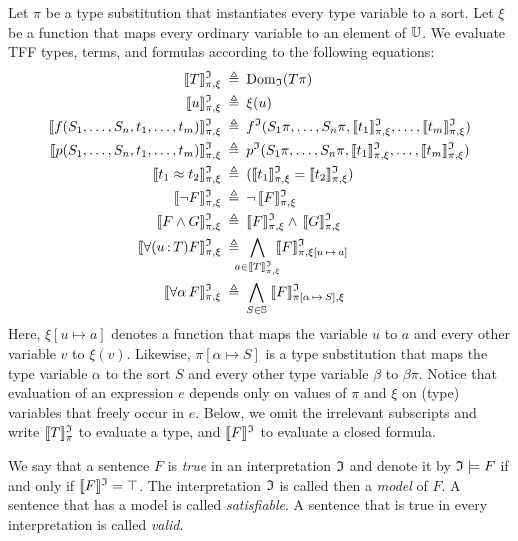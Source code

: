 \newcommand{\eval}[1]{\llbracket#1\rrbracket^\cI_{\pi,\xi}}
\newcommand{\evalT}[1]{\llbracket#1\rrbracket^\cI_{\pi}}
\newcommand{\evalG}[1]{\llbracket#1\rrbracket^\cI}
Let $\pi$ be a type substitution that instantiates every
type variable to a sort. Let $\xi$ be a function that maps
every ordinary variable to an element of $\mathbb{U}$.
We evaluate TFF types, terms, and formulas according
to the following equations:
\begin{align*}
\eval{T} &\eqdef \dom_{\cI} (T\pi) \\
\eval{u} &\eqdef \xi(u) \\
\eval{f(S_1,\dots,S_n,t_1,\dots,t_m)} &\eqdef
f^\cI(S_1\pi,\dots,S_n\pi,\eval{t_1},\dots,\eval{t_m}) \\
\eval{p(S_1,\dots,S_n,t_1,\dots,t_m)} &\eqdef
p^\cI(S_1\pi,\dots,S_n\pi,\eval{t_1},\dots,\eval{t_m}) \\
\eval{t_1 \approx t_2} &\eqdef (\eval{t_1} = \eval{t_2}) \\
\eval{\lnot F} &\eqdef \lnot\, \eval{F} \\
\eval{F \land G} &\eqdef \eval{F} \land\, \eval{G} \\
\eval{\forall (u \ty T) F} &\eqdef\!\!\!\!\!
\bigwedge_{a \in \eval{T}} \!\!
\llbracket F \rrbracket^\cI_{\pi,\xi[u\,\mapsto\,a]} \\
\eval{\forall \alpha\, F} &\eqdef
\bigwedge_{S \in \sorts}\;
\llbracket F \rrbracket^\cI_{\pi[\alpha\,\mapsto\,S],\xi}
\end{align*}
Here, $\xi[u \mapsto a]$ denotes a function that
maps the variable $u$ to $a$ and every other variable $v$
to $\xi(v)$. Likewise, $\pi[\alpha \mapsto S]$ is a type
substitution that maps the type variable $\alpha$ to the
sort $S$ and every other type variable $\beta$ to $\beta\pi$.
Notice that evaluation of an expression $e$ depends only
on values of $\pi$ and $\xi$ on (type) variables that
freely occur in $e$. Below, we omit the irrelevant
subscripts and write $\evalT{T}$ to evaluate a type,
and $\evalG{F}$ to evaluate a closed formula.

We say that a sentence $F$ is {\em true} in an interpretation $\mathfrak{I}$
and denote it by $\mathfrak{I} \models F$ if and only if $\evalG{F} = \top$.
The interpretation $\mathfrak{I}$ is called then a {\em model\/} of $F$.
A sentence that has a model is called {\em satisfiable}.
A sentence that is true in every interpretation is called {\em valid}.

\newpage
